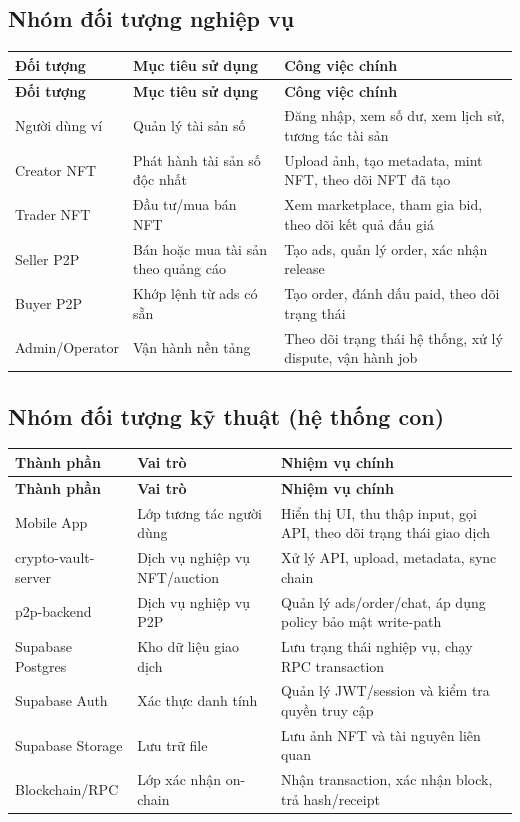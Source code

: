 \documentclass[a4paper,12pt]{report}
\begin{document}
\subsection{Nhóm đối tượng nghiệp vụ}
\begin{longtable}{|p{3.0cm}|p{5.0cm}|p{5.2cm}|}
\hline
\textbf{Đối tượng} & \textbf{Mục tiêu sử dụng} & \textbf{Công việc chính} \\
\hline
\endfirsthead
\hline
\textbf{Đối tượng} & \textbf{Mục tiêu sử dụng} & \textbf{Công việc chính} \\
\hline
\endhead
Người dùng ví & Quản lý tài sản số & Đăng nhập, xem số dư, xem lịch sử, tương tác tài sản \\
\hline
Creator NFT & Phát hành tài sản số độc nhất & Upload ảnh, tạo metadata, mint NFT, theo dõi NFT đã tạo \\
\hline
Trader NFT & Đầu tư/mua bán NFT & Xem marketplace, tham gia bid, theo dõi kết quả đấu giá \\
\hline
Seller P2P & Bán hoặc mua tài sản theo quảng cáo & Tạo ads, quản lý order, xác nhận release \\
\hline
Buyer P2P & Khớp lệnh từ ads có sẵn & Tạo order, đánh dấu paid, theo dõi trạng thái \\
\hline
Admin/Operator & Vận hành nền tảng & Theo dõi trạng thái hệ thống, xử lý dispute, vận hành job \\
\hline
\end{longtable}

\subsection{Nhóm đối tượng kỹ thuật (hệ thống con)}
\begin{longtable}{|p{3.4cm}|p{4.4cm}|p{5.4cm}|}
\hline
\textbf{Thành phần} & \textbf{Vai trò} & \textbf{Nhiệm vụ chính} \\
\hline
\endfirsthead
\hline
\textbf{Thành phần} & \textbf{Vai trò} & \textbf{Nhiệm vụ chính} \\
\hline
\endhead
Mobile App & Lớp tương tác người dùng & Hiển thị UI, thu thập input, gọi API, theo dõi trạng thái giao dịch \\
\hline
crypto-vault-server & Dịch vụ nghiệp vụ NFT/auction & Xử lý API, upload, metadata, sync chain \\
\hline
p2p-backend & Dịch vụ nghiệp vụ P2P & Quản lý ads/order/chat, áp dụng policy bảo mật write-path \\
\hline
Supabase Postgres & Kho dữ liệu giao dịch & Lưu trạng thái nghiệp vụ, chạy RPC transaction \\
\hline
Supabase Auth & Xác thực danh tính & Quản lý JWT/session và kiểm tra quyền truy cập \\
\hline
Supabase Storage & Lưu trữ file & Lưu ảnh NFT và tài nguyên liên quan \\
\hline
Blockchain/RPC & Lớp xác nhận on-chain & Nhận transaction, xác nhận block, trả hash/receipt \\
\hline
\end{longtable}
\end{document}
